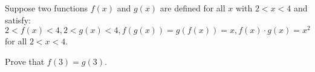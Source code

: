Suppose two functions $f(x)$ and $g(x)$ are defined for all $x$ with $2<x<4$ and satisfy: $2<f(x)<4,2<g(x)<4,f(g(x))=g(f(x))=x,f(x)\cdot g(x)=x^2$ for all $2<x<4$.

Prove that $f(3)=g(3)$.